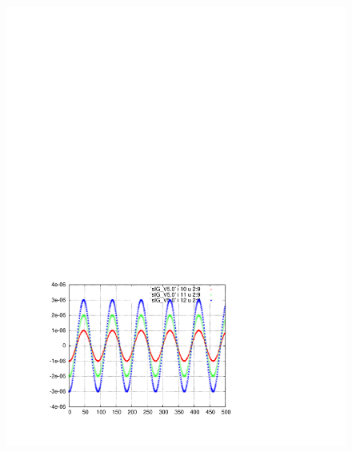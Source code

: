 \documentclass[]{article}
\begin{document}
%
\begin{figure}[h]
\begin{minipage}[b]{0.45\linewidth}
\centering
\includegraphics[scale=0.55]{pdf/delta_vs_turn_V5p0.pdf}
\end{minipage}
%
\begin{minipage}[b]{0.45\linewidth}
\centering

\end{minipage}
\end{figure}
\end{document}
